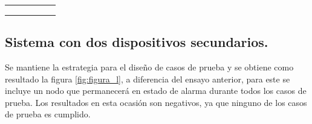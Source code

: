 \begin{table}[h]
\begin{tabular}{clcllc}
                                                                  &                                                                                   &                          & \multicolumn{2}{l}{}                                                                                                                                                                                                                                                                                            &                                                                                                                          \\
                                                                  &                                                                                   &                          & \multicolumn{2}{l}{}                                                                                                                                                                                                                                                                                            &                                                                                                                          \\
\multicolumn{1}{l}{}                                              &                                                                                   & \multicolumn{1}{l}{}     &                                                                                                                                                        &                                                                                                                                                        & \multicolumn{1}{l}{}                                                                                                    
\\
\bottomrule
\hline                                                                        
\end{tabular}
\label{tab:tabla_4_2}
\end{table}

\subsection{Sistema con dos dispositivos secundarios.}

Se mantiene la estrategia para el diseño de casos de prueba y se obtiene como resultado la figura \ref{fig:figura_l}, a diferencia del ensayo anterior, para este se incluye un nodo que permanecerá en estado de alarma durante todos los casos de prueba. Los resultados en esta ocasión son negativos, ya que ninguno de los casos de prueba es cumplido.

